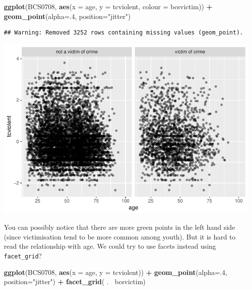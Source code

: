\documentclass[]{book}
\newenvironment{Shaded}{\begin{snugshade}}{\end{snugshade}}
\newcommand{\DataTypeTok}[1]{\textcolor[rgb]{0.13,0.29,0.53}{#1}}
\newcommand{\DecValTok}[1]{\textcolor[rgb]{0.00,0.00,0.81}{#1}}
\newcommand{\KeywordTok}[1]{\textcolor[rgb]{0.13,0.29,0.53}{\textbf{#1}}}
\newcommand{\NormalTok}[1]{#1}
\newcommand{\OperatorTok}[1]{\textcolor[rgb]{0.81,0.36,0.00}{\textbf{#1}}}
\newcommand{\StringTok}[1]{\textcolor[rgb]{0.31,0.60,0.02}{#1}}
\theoremstyle{definition}
\theoremstyle{definition}
\theoremstyle{definition}
\theoremstyle{remark}
\begin{document}
\begin{Shaded}
\begin{Highlighting}[]
\KeywordTok{ggplot}\NormalTok{(BCS0708, }\KeywordTok{aes}\NormalTok{(}\DataTypeTok{x =}\NormalTok{ age, }\DataTypeTok{y =}\NormalTok{ tcviolent, }\DataTypeTok{colour =}\NormalTok{ bcsvictim)) }\OperatorTok{+}
\StringTok{  }\KeywordTok{geom_point}\NormalTok{(}\DataTypeTok{alpha=}\NormalTok{.}\DecValTok{4}\NormalTok{, }\DataTypeTok{position=}\StringTok{"jitter"}\NormalTok{)}
\end{Highlighting}
\end{Shaded}

\begin{verbatim}
## Warning: Removed 3252 rows containing missing values (geom_point).
\end{verbatim}

\includegraphics{03-visualisation_files/figure-latex/unnamed-chunk-48-1.pdf}

You can possibly notice that there are more green points in the left
hand side (since victimisation tend to be more common among youth). But
it is hard to read the relationship with age. We could try to use facets
instead using \texttt{facet\_grid}?

\begin{Shaded}
\begin{Highlighting}[]
\KeywordTok{ggplot}\NormalTok{(BCS0708, }\KeywordTok{aes}\NormalTok{(}\DataTypeTok{x =}\NormalTok{ age, }\DataTypeTok{y =}\NormalTok{ tcviolent)) }\OperatorTok{+}
\StringTok{  }\KeywordTok{geom_point}\NormalTok{(}\DataTypeTok{alpha=}\NormalTok{.}\DecValTok{4}\NormalTok{, }\DataTypeTok{position=}\StringTok{"jitter"}\NormalTok{) }\OperatorTok{+}
\StringTok{  }\KeywordTok{facet_grid}\NormalTok{( .}\OperatorTok{~}\StringTok{ }\NormalTok{bcsvictim)}
\end{Highlighting}
\end{Shaded}
\end{document}
